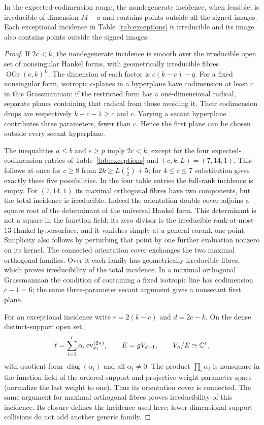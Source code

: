 \begin{lemma}
\label{lem:orientation-incidences}
In the expected-codimension range, the nondegenerate incidence, when
feasible, is irreducible of dimension $M-a$ and contains points outside
all the signed images. Each exceptional incidence in
Table~\ref{tab:exceptions} is irreducible and its image also contains
points outside the signed images.
\end{lemma}
\begin{proof}
If $2c<k$, the nondegenerate incidence is smooth over the irreducible
open set of nonsingular Hankel forms, with geometrically irreducible
fibres $\operatorname{OGr}(c,k)^L$. The dimension of each factor is
$c(k-c)-q$. For a fixed nonsingular form, isotropic $c$-planes in a
hyperplane have codimension at least $c$ in this Grassmannian: if the
restricted form has a one-dimensional radical, separate planes
containing that radical from those avoiding it. Their codimension drops
are respectively $k-c-1\ge c$ and $c$. Varying a secant hyperplane
contributes three parameters, fewer than $c$. Hence the first plane can
be chosen outside every secant hyperplane.

The inequalities $a\le b$ and $e\ge p$ imply $2c<k$, except for the
four expected-codimension entries of Table~\ref{tab:exceptions} and
$(c,k,L)=(7,14,1)$. This follows at once for $c\ge8$ from
$2k\ge L\binom c2+5$; for $4\le c\le7$ substitution gives exactly
these five possibilities. In the four table entries the full-rank
incidence is empty. For $(7,14,1)$ its maximal orthogonal fibres have
two components, but the total incidence is irreducible. Indeed the
orientation double cover adjoins a square root of the determinant of
the universal Hankel form. This determinant is not a square in the
function field: its zero divisor is the irreducible rank-at-most-$13$
Hankel hypersurface, and it vanishes simply at a general corank-one
point. Simplicity also follows by perturbing that point by one further
evaluation nonzero on its kernel. The connected orientation cover
exchanges the two maximal orthogonal families. Over it each family has
geometrically irreducible fibres, which proves irreducibility of the
total incidence. In a maximal orthogonal Grassmannian the condition of
containing a fixed isotropic line has codimension $c-1=6$; the same
three-parameter secant argument gives a nonsecant first plane.

For an exceptional incidence write $r=2(k-c)$ and $d=2c-k$.
On the dense distinct-support open set,
\[
 \ell=\sum_{i=1}^r\alpha_i\operatorname{ev}_{x_i}^{(2n)},
 \qquad E=gV_{d-1},\qquad
 V_n/E\simeq\mathbb C^r,
\]
with quotient form $\operatorname{diag}(\alpha_i)$ and all
$\alpha_i\ne0$. The product $\prod_i\alpha_i$ is nonsquare in the
function field of the ordered support and projective weight parameter
space (normalize the last weight to one). Thus its orientation cover
is connected. The same argument for maximal orthogonal fibres proves
irreducibility of this incidence. Its closure defines the incidence
used here; lower-dimensional support collisions do not add another
generic family.


\end{proof}
